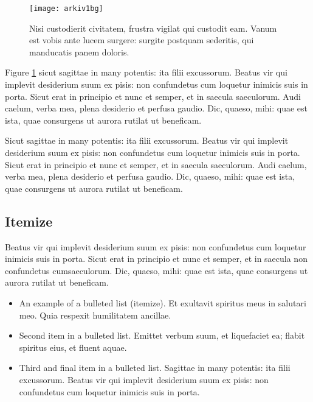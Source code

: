 \documentclass{arkiv}
\begin{document}
\begin{figure}[t]
\texttt{[image: arkiv1bg]}
\caption{%
Nisi custodierit civitatem, frustra vigilat qui custodit eam. Vanum
est vobis ante lucem surgere: surgite postquam sederitis, qui
manducatis panem doloris.}\label{f1} %
\end{figure}


Figure \ref{f1} sicut sagittae in many potentis: ita filii excussorum. Beatus vir qui
implevit desiderium suum ex pisis: non confundetus cum loquetur inimicis
suis in porta.  Sicut erat in principio et nunc et semper, et in saecula
saeculorum. Audi caelum, verba mea, plena desiderio et perfusa gaudio.
Dic, quaeso, mihi: quae est ista, quae consurgens ut aurora rutilat ut
beneficam.

Sicut sagittae in many potentis: ita filii excussorum. Beatus vir qui
implevit desiderium suum ex pisis: non confundetus cum loquetur inimicis
suis in porta.  Sicut erat in principio et nunc et semper, et in saecula
saeculorum. Audi caelum, verba mea, plena desiderio et perfusa gaudio.
Dic, quaeso, mihi: quae est ista, quae consurgens ut aurora rutilat ut
beneficam.



\subsection{Itemize}

Beatus vir qui implevit desiderium
suum ex pisis: non confundetus cum loquetur inimicis suis in porta.
Sicut erat in principio et nunc et semper, et in saecula non
confundetus cumsaeculorum. Dic, quaeso, mihi: quae est ista, quae
consurgens ut aurora rutilat ut beneficam.

\begin{itemize}
\item An example of a bulleted list (itemize). Et exultavit spiritus meus in salutari meo.
Quia respexit humilitatem ancillae.

\item Second item in a bulleted list. Emittet verbum suum, et liquefaciet
ea; flabit spiritus eius, et fluent aquae.

\item Third and final item in a bulleted list. Sagittae in many potentis:
ita filii excussorum.  Beatus vir qui implevit desiderium suum ex
pisis: non confundetus cum loquetur inimicis suis in porta.
\end{itemize}
\end{document}
